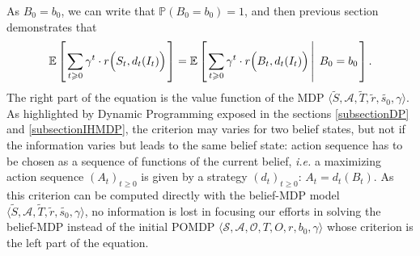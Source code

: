 As $B_0 = b_0$, we can write that $\mathbb{P}(B_0 = b_0) = 1$, and then previous section demonstrates that 
\[ \mathbb{E} \left[ \left.  \sum_{ t \geqslant 0} \gamma^t \cdot r\Big(S_t,d_t(I_t)\Big)  \right. \right] = \mathbb{E} \left[ \left.  \sum_{ t \geqslant 0} \gamma^t \cdot  r\Big(B_t,d_t(I_t)\Big) \, \right| \left. \, B_0 = b_0  \right. \right]. \]
The right part of the equation is the value function of the MDP $\langle \tilde{S}, \mathcal{A}, \tilde{T}, \tilde{r}, \tilde{s_0}, \gamma  \rangle$.
As highlighted by Dynamic Programming exposed in the sections \ref{subsectionDP} and \ref{subsectionIHMDP}, 
the criterion may varies for two belief states, but not if the information varies but leads to the same belief state:
action sequence has to be chosen as a sequence of functions of the current belief,
\textit{i.e.} a maximizing action sequence $(A_t)_{t \geqslant 0}$ 
is given by a strategy $(d_t)_{t \geqslant 0}$: $A_t = d_t(B_t)$.
As this criterion can be computed directly with the belief-MDP model 
$\langle \tilde{S}, \mathcal{A}, \tilde{T}, \tilde{r}, \tilde{s_0}, \gamma  \rangle$,
no information is lost in focusing our efforts in solving 
the belief-MDP instead of the initial POMDP $\langle \mathcal{S}, \mathcal{A}, \mathcal{O}, T, O, r, b_0, \gamma \rangle$
whose criterion is the left part of the equation. 


